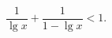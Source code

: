 \begin{ex}[type=inequality]
	\begin{condition}
		$  \dfrac{1}{\lg x} + \dfrac{1}{1 - \lg x}<1.$
	\end{condition}
\end{ex}